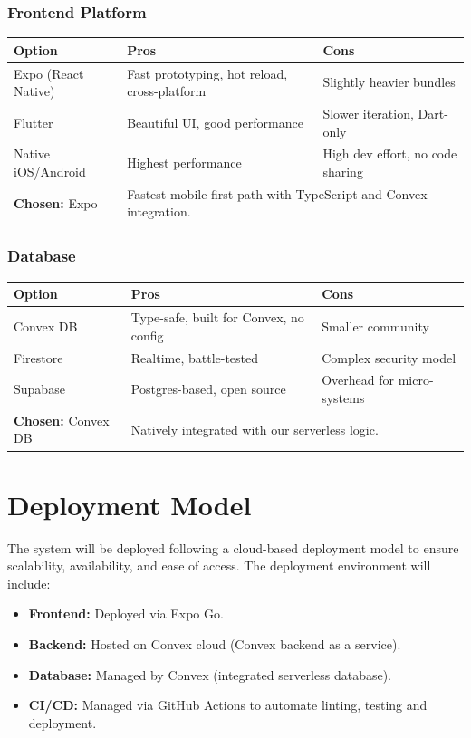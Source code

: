 \documentclass[12pt]{article}
\begin{document}
\subsubsection*{Frontend Platform}
\begin{tabular}{|l|p{6cm}|p{6cm}|}
\hline
\textbf{Option} & \textbf{Pros} & \textbf{Cons} \\
\hline
Expo (React Native) & Fast prototyping, hot reload, cross-platform & Slightly heavier bundles \\
\hline
Flutter & Beautiful UI, good performance & Slower iteration, Dart-only \\
\hline
Native iOS/Android & Highest performance & High dev effort, no code sharing \\
\hline
\textbf{Chosen:} Expo & \multicolumn{2}{l|}{Fastest mobile-first path with TypeScript and Convex integration.} \\
\hline
\end{tabular}

\vspace{1em}

\subsubsection*{Database}
\begin{tabular}{|l|p{6cm}|p{6cm}|}
\hline
\textbf{Option} & \textbf{Pros} & \textbf{Cons} \\
\hline
Convex DB & Type-safe, built for Convex, no config & Smaller community \\
\hline
Firestore & Realtime, battle-tested & Complex security model \\
\hline
Supabase & Postgres-based, open source & Overhead for micro-systems \\
\hline
\textbf{Chosen:} Convex DB & \multicolumn{2}{l|}{Natively integrated with our serverless logic.} \\
\hline
\end{tabular}

\section{Deployment Model}
The system will be deployed following a cloud-based deployment model to ensure scalability, availability, and ease of access. The deployment environment will include:
\begin{itemize}
    \item \textbf{Frontend:} Deployed via Expo Go.
    \item \textbf{Backend:} Hosted on Convex cloud (Convex backend as a service).
    \item \textbf{Database:}  Managed by Convex (integrated serverless database).
    \item \textbf{CI/CD:} Managed via GitHub Actions to automate linting, testing and deployment.
\end{itemize}
\end{document}
